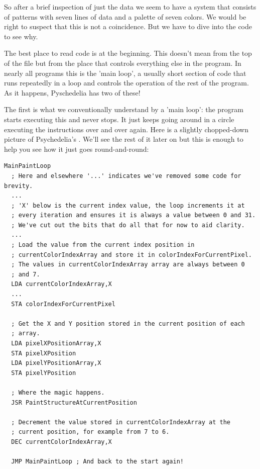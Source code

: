 So after a brief inspection of just the data we seem to have a system that consists of patterns with seven lines of data and a palette
of seven colors. We would be right to suspect that this is not a coincidence. But we have to dive into the code to see why.

The best place to read code is at the beginning. This doesn't mean from the top of the file but from the place that controls everything
else in the program. In nearly all programs this is the 'main loop', a usually short section of code that runs repeatedly in a loop and
controls the operation of the rest of the program. As it happens, Pyschedelia has two of these! 

The first is what we conventionally 
understand by a 'main loop': the program starts executing this and never stops. It just keeps going around in a circle executing the instructions 
over and over again. Here is a slightly chopped-down picture of Psychedelia's . We'll see the rest of it later on
but this is enough to help you see how it just goes round-and-round:

\begin{lstlisting}
MainPaintLoop   
  ; Here and elsewhere '...' indicates we've removed some code for brevity.
  ... 
  ; 'X' below is the current index value, the loop increments it at
  ; every iteration and ensures it is always a value between 0 and 31. 
  ; We've cut out the bits that do all that for now to aid clarity.
  ...
  ; Load the value from the current index position in
  ; currentColorIndexArray and store it in colorIndexForCurrentPixel.
  ; The values in currentColorIndexArray array are always between 0 
  ; and 7. 
  LDA currentColorIndexArray,X
  ...
  STA colorIndexForCurrentPixel

  ; Get the X and Y position stored in the current position of each
  ; array.
  LDA pixelXPositionArray,X
  STA pixelXPosition
  LDA pixelYPositionArray,X
  STA pixelYPosition

  ; Where the magic happens.
  JSR PaintStructureAtCurrentPosition

  ; Decrement the value stored in currentColorIndexArray at the
  ; current position, for example from 7 to 6.
  DEC currentColorIndexArray,X

  JMP MainPaintLoop ; And back to the start again!
\end{lstlisting}

